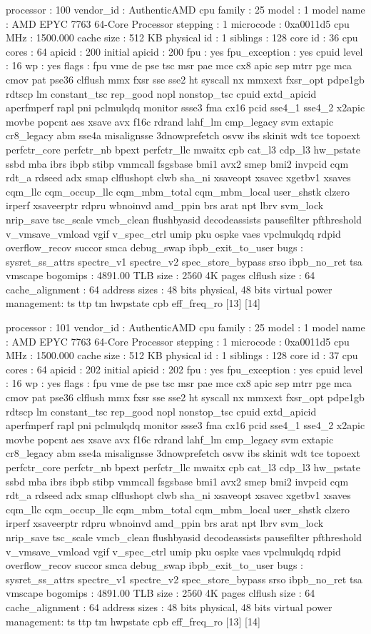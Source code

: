 processor	: 100
vendor_id	: AuthenticAMD
cpu family	: 25
model		: 1
model name	: AMD EPYC 7763 64-Core Processor
stepping	: 1
microcode	: 0xa0011d5
cpu MHz		: 1500.000
cache size	: 512 KB
physical id	: 1
siblings	: 128
core id		: 36
cpu cores	: 64
apicid		: 200
initial apicid	: 200
fpu		: yes
fpu_exception	: yes
cpuid level	: 16
wp		: yes
flags		: fpu vme de pse tsc msr pae mce cx8 apic sep mtrr pge mca cmov pat pse36 clflush mmx fxsr sse sse2 ht syscall nx mmxext fxsr_opt pdpe1gb rdtscp lm constant_tsc rep_good nopl nonstop_tsc cpuid extd_apicid aperfmperf rapl pni pclmulqdq monitor ssse3 fma cx16 pcid sse4_1 sse4_2 x2apic movbe popcnt aes xsave avx f16c rdrand lahf_lm cmp_legacy svm extapic cr8_legacy abm sse4a misalignsse 3dnowprefetch osvw ibs skinit wdt tce topoext perfctr_core perfctr_nb bpext perfctr_llc mwaitx cpb cat_l3 cdp_l3 hw_pstate ssbd mba ibrs ibpb stibp vmmcall fsgsbase bmi1 avx2 smep bmi2 invpcid cqm rdt_a rdseed adx smap clflushopt clwb sha_ni xsaveopt xsavec xgetbv1 xsaves cqm_llc cqm_occup_llc cqm_mbm_total cqm_mbm_local user_shstk clzero irperf xsaveerptr rdpru wbnoinvd amd_ppin brs arat npt lbrv svm_lock nrip_save tsc_scale vmcb_clean flushbyasid decodeassists pausefilter pfthreshold v_vmsave_vmload vgif v_spec_ctrl umip pku ospke vaes vpclmulqdq rdpid overflow_recov succor smca debug_swap ibpb_exit_to_user
bugs		: sysret_ss_attrs spectre_v1 spectre_v2 spec_store_bypass srso ibpb_no_ret tsa vmscape
bogomips	: 4891.00
TLB size	: 2560 4K pages
clflush size	: 64
cache_alignment	: 64
address sizes	: 48 bits physical, 48 bits virtual
power management: ts ttp tm hwpstate cpb eff_freq_ro [13] [14]

processor	: 101
vendor_id	: AuthenticAMD
cpu family	: 25
model		: 1
model name	: AMD EPYC 7763 64-Core Processor
stepping	: 1
microcode	: 0xa0011d5
cpu MHz		: 1500.000
cache size	: 512 KB
physical id	: 1
siblings	: 128
core id		: 37
cpu cores	: 64
apicid		: 202
initial apicid	: 202
fpu		: yes
fpu_exception	: yes
cpuid level	: 16
wp		: yes
flags		: fpu vme de pse tsc msr pae mce cx8 apic sep mtrr pge mca cmov pat pse36 clflush mmx fxsr sse sse2 ht syscall nx mmxext fxsr_opt pdpe1gb rdtscp lm constant_tsc rep_good nopl nonstop_tsc cpuid extd_apicid aperfmperf rapl pni pclmulqdq monitor ssse3 fma cx16 pcid sse4_1 sse4_2 x2apic movbe popcnt aes xsave avx f16c rdrand lahf_lm cmp_legacy svm extapic cr8_legacy abm sse4a misalignsse 3dnowprefetch osvw ibs skinit wdt tce topoext perfctr_core perfctr_nb bpext perfctr_llc mwaitx cpb cat_l3 cdp_l3 hw_pstate ssbd mba ibrs ibpb stibp vmmcall fsgsbase bmi1 avx2 smep bmi2 invpcid cqm rdt_a rdseed adx smap clflushopt clwb sha_ni xsaveopt xsavec xgetbv1 xsaves cqm_llc cqm_occup_llc cqm_mbm_total cqm_mbm_local user_shstk clzero irperf xsaveerptr rdpru wbnoinvd amd_ppin brs arat npt lbrv svm_lock nrip_save tsc_scale vmcb_clean flushbyasid decodeassists pausefilter pfthreshold v_vmsave_vmload vgif v_spec_ctrl umip pku ospke vaes vpclmulqdq rdpid overflow_recov succor smca debug_swap ibpb_exit_to_user
bugs		: sysret_ss_attrs spectre_v1 spectre_v2 spec_store_bypass srso ibpb_no_ret tsa vmscape
bogomips	: 4891.00
TLB size	: 2560 4K pages
clflush size	: 64
cache_alignment	: 64
address sizes	: 48 bits physical, 48 bits virtual
power management: ts ttp tm hwpstate cpb eff_freq_ro [13] [14]

